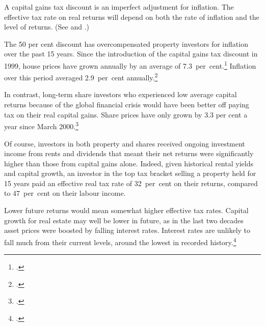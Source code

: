 A capital gains tax discount is an imperfect adjustment for inflation. The effective tax rate on real returns will depend on both the rate of inflation and the level of returns. (See  and .)

The 50 per cent discount has overcompensated property investors for inflation over the past 15 years. Since the introduction of the capital gains tax discount in 1999, house prices have grown annually by an average of 7.3~per~cent.\footcite{ABS2015HousingFinance} Inflation over this period averaged 2.9~per~cent annually.\footcite{ABSVariousyearsCPI}

In contrast, long-term share investors who experienced low average capital returns because of the global financial crisis would have been better off paying tax on their real capital gains. Share prices have only grown by 3.3 per cent a year since March 2000.\footcite{Finance2015}

Of course, investors in both property and shares received ongoing investment income from rents and dividends that meant their net returns were significantly higher than those from capital gains alone. Indeed, given historical rental yields and capital growth, an investor in the top tax bracket selling a property held for 15 years paid an effective real tax rate of 32~per~cent on their returns, compared to 47~per~cent on their labour income.

Lower future returns would mean somewhat higher effective tax rates. Capital growth for real estate may well be lower in future, as in the last two decades asset prices were boosted by falling interest rates. Interest rates are unlikely to fall much from their current levels, around the lowest in recorded history.\footcite[][19]{Haldane2015}

